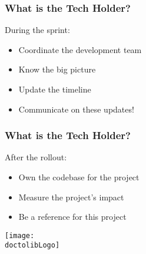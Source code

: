 \begin{frame}
	\frametitle{What is the Tech Holder?}
	During the sprint:
	\begin{itemize}[<+->]
		\item Coordinate the development team
		\item Know the big picture
		\item Update the timeline
		\item Communicate on these updates!
	\end{itemize}
\end{frame}

\begin{frame}
	\frametitle{What is the Tech Holder?}
	After the rollout:
	\begin{itemize}[<+->]
		\item Own the codebase for the project
		\item Measure the project's impact
		\item Be a reference for this project
	\end{itemize}
\end{frame}

\begin{frame}
	\vfill
	\centering
	\texttt{[image: \\doctolibLogo]}
	\vfill
\end{frame}
